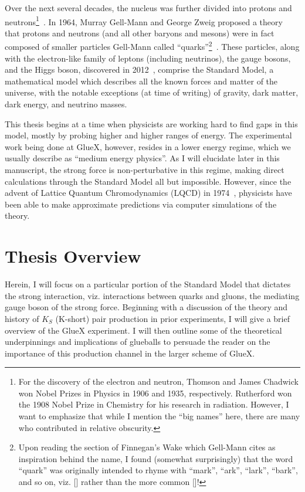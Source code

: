 Over the next several decades, the nucleus was further divided into protons and neutrons\footnote{For the discovery of the electron and neutron, Thomson and James Chadwick won Nobel Prizes in Physics in 1906 and 1935, respectively. Rutherford won the 1908 Nobel Prize in Chemistry for his research in radiation. However, I want to emphasize that while I mention the ``big names'' here, there are many who contributed in relative obscurity.}~\cite{masson_xxiv_1921,chadwick_possible_1932}. In 1964, Murray Gell-Mann and George Zweig proposed a theory that protons and neutrons (and all other baryons and mesons) were in fact composed of smaller particles Gell-Mann called ``quarks''\footnote{Upon reading the section of Finnegan's Wake which Gell-Mann cites as inspiration behind the name, I found (somewhat surprisingly) that the word ``quark'' was originally intended to rhyme with ``mark'', ``ark'', ``lark'', ``bark'', and so on, viz. [] rather than the more common []!}~\cite{gell-mann_schematic_1964}. These particles, along with the electron-like family of leptons (including neutrinos), the gauge bosons, and the Higgs boson, discovered in 2012~\cite{aad_observation_2012}, comprise the Standard Model, a mathematical model which describes all the known forces and matter of the universe, with the notable exceptions (at time of writing) of gravity, dark matter, dark energy, and neutrino masses.

This thesis begins at a time when physicists are working hard to find gaps in this model, mostly by probing higher and higher ranges of energy. The experimental work being done at GlueX, however, resides in a lower energy regime, which we usually describe as ``medium energy physics''. As I will elucidate later in this manuscript, the strong force is non-perturbative in this regime, making direct calculations through the Standard Model all but impossible. However, since the advent of Lattice Quantum Chromodynamics (LQCD) in 1974~\cite{wilson_confinement_1974}, physicists have been able to make approximate predictions via computer simulations of the theory.

\section{Thesis Overview}\label{sec:thesis_overview}

Herein, I will focus on a particular portion of the Standard Model that dictates the strong interaction, viz. interactions between quarks and gluons, the mediating gauge boson of the strong force. Beginning with a discussion of the theory and history of $K_S$ (K-short) pair production in prior experiments, I will give a brief overview of the GlueX experiment. I will then outline some of the theoretical underpinnings and implications of glueballs to persuade the reader on the importance of this production channel in the larger scheme of GlueX.

